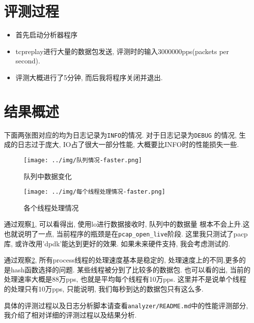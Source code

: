 \section{评测过程}

\begin{itemize}
    \item 首先启动分析器程序
    \item tcpreplay进行大量的数据包发送, 评测时的输入3000000pps(packets per second).
    \item 评测大概进行了5分钟, 而后我将程序关闭并退出.
\end{itemize}

\section{结果概述}

 下面两张图对应的均为日志记录为\texttt{INFO}的情况. 对于日志记录为\texttt{DEBUG}
的情况, 生成的日志过于庞大, IO占了很大一部分性能, 大概要比INFO时的性能损失一些.

\begin{figure}[htbp!]
  \centering
  \texttt{[image: ../img/队列情况-faster.png]}
  \caption{队列中数据变化}
  \label{fig:queue_pic}
\end{figure}

\begin{figure}[htbp!]
  \centering
  \texttt{[image: ../img/每个线程处理情况-faster.png]}
  \caption{各个线程处理情况}
  \label{fig:process_pic}
\end{figure}


通过观察\ref{fig:queue_pic}, 可以看得出, 使用lo进行数据接收时, 队列中的数据量
根本不会上升.这也就说明了一点, 当前程序的瓶颈是在\texttt{pcap\_open\_live}阶段. 这里我只测试了pacp库, 或许改用'dpdk'能达到更好的效果.
如果未来硬件支持, 我会考虑测试的.

通过观察\ref{fig:process_pic}, 所有process线程的处理速度基本是稳定的,
处理速度上的不同,更多的是hash函数选择的问题. 某些线程被分到了比较多的数据包.
也可以看的出, 当前的处理速率大概是88万pps, 也就是平均每个线程有10万pps.
这里并不是说单个线程的处理只有10万pps, 只能说明, 我们每秒到达的数据包只有这么多.

具体的评测过程以及日志分析脚本请查看\texttt{analyzer/README.md}中的性能评测部分, 
我介绍了相对详细的评测过程以及结果分析.


